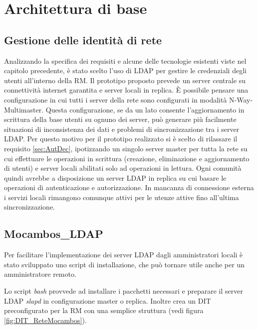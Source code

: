 \section{Architettura di base}

\subsection{Gestione delle identità di rete}
Analizzando la specifica dei requisiti e alcune delle tecnologie
esistenti viste nel capitolo precedente, è stato scelto l'uso di LDAP
per gestire le credenziali degli utenti all'interno della RM. Il
prototipo proposto prevede un server centrale su connettività internet
garantita e server locali in replica. È possibile pensare una
configurazione in cui tutti i server della rete sono configurati in
modalità N-Way-Multimaster. Questa configurazione, se da un lato
consente l'aggiornamento in scrittura della base utenti su ognuno dei
server, può generare più facilmente situazioni di inconsistenza dei
dati e problemi di sincronizzazione tra i server LDAP. Per questo
motivo per il prototipo realizzato si è scelto di rilassare il
requisito \ref{sec:AutDec}, ipotizzando un singolo server master per
tutta la rete su cui effettuare le operazioni in scrittura (creazione,
eliminazione e aggiornamento di utenti) e server locali abilitati solo
ad operazioni in lettura. Ogni comunità quindi avrebbe a disposizione
un server LDAP in replica su cui basare le operazioni di
autenticazione e autorizzazione. In mancanza di connessione esterna i
servizi locali rimangono comunque attivi per le utenze attive fino
all'ultima sincronizzazione.


\subsection{Mocambos\_LDAP}

Per facilitare l'implementazione dei server LDAP dagli amministratori
locali è stato sviluppato uno script di installazione, che può tornare
utile anche per un amministratore remoto.

Lo script \textit{bash} provvede ad installare i pacchetti necessari e
preparare il server LDAP \emph{slapd} in configurazione master o
replica. Inoltre crea un DIT preconfigurato per la RM con una semplice
struttura (vedi figura \ref{fig:DIT_ReteMocambos}).

